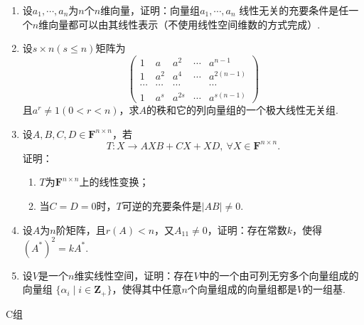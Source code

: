 \begin{enumerate}
	\item 设$a_1,\cdots,a_n$为$n$个$n$维向量，证明：向量组$a_1,\cdots,a_n$
	线性无关的充要条件是任一个$n$维向量都可以由其线性表示（不使用线性空间维数的方式完成）.
	\item 设$s \times n(s\le n)$矩阵为
	\[\begin{pmatrix}
		1 & a & a^2 & \cdots & a^{n-1} \\
		1 & a^2 & a^4 & \cdots & a^{2(n-1)} \\
		\cdots & \cdots & \cdots &  & \cdots \\
		1 & a^s & a^{2s} & \cdots & a^{s(n-1)}
	\end{pmatrix}\]
	且$a^r\neq 1(0<r<n)$，求$A$的秩和它的列向量组的一个极大线性无关组.
    \item 设$A,B,C,D \in \mathbf{F}^{n \times n}$，若
	\[T:X \to AXB+CX+XD,\ \forall X \in \mathbf{F}^{n \times n}.\]
	证明：
    \begin{enumerate}[label=(\arabic*)]
        \item $T$为$\mathbf{F}^{n \times n}$上的线性变换；
        \item 当$C=D=0$时，$T$可逆的充要条件是$|AB| \neq 0$.
    \end{enumerate}
    \item 设$A$为$n$阶矩阵，且$r(A) < n$，又$A_{11} \neq 0$，证明：存在常数$k$，使得
	$(A^*)^2=kA^*$.
    \item 设$V$是一个$n$维实线性空间，证明：存在$V$中的一个由可列无穷多个向量组成的向量组
    $\{\alpha_i \mid i\in\mathbf{Z}_+\}$，使得其中任意$n$个向量组成的向量组都是$V$的一组基.
\end{enumerate}
\centerline{\heiti C组}
